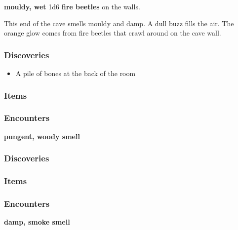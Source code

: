\textbf{mouldy, wet}
1d6 \textbf{fire beetles} on the walls.
\begin{DndReadAloud}
	This end of the cave smells mouldy and damp. A dull buzz fills the air. The
	orange glow comes from fire beetles that crawl around on the cave wall.
\end{DndReadAloud}
\subsubsection{Discoveries}
\begin{itemize}
    \item A pile of bones at the back of the room
\end{itemize}
\subsubsection{Items}
\begin{itemize}
\end{itemize}
\subsubsection{Encounters}
\begin{itemize}
\end{itemize}

\textbf{pungent, woody smell}
\begin{DndReadAloud}
\end{DndReadAloud}
\subsubsection{Discoveries}
\begin{itemize}
\end{itemize}
\subsubsection{Items}
\begin{itemize}
\end{itemize}
\subsubsection{Encounters}
\begin{itemize}
\end{itemize}

\textbf{damp, smoke smell}
\begin{DndReadAloud}
\end{DndReadAloud}
